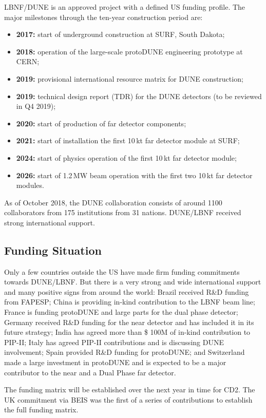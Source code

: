 LBNF/DUNE is an approved project with a defined US funding profile. The major milestones through the ten-year construction period are:
\begin{itemize}
     \item {\bf 2017:} start of underground construction at SURF, South Dakota;
     \item {\bf 2018:} operation of the large-scale protoDUNE engineering prototype at CERN; 
     \item {\bf 2019:} provisional international resource matrix for DUNE construction;
     \item {\bf 2019:} technical design report (TDR) for the DUNE detectors (to be reviewed in Q4 2019);
     \item {\bf 2020:} start of production of far detector components;
     \item {\bf 2021:} start of installation the first 10\,kt far detector module at SURF; 
     \item {\bf 2024:} start of physics operation of the first 10\,kt far detector module;
     \item {\bf 2026:} start of 1.2\,MW beam operation with the first two 10\,kt far detector modules.  
\end{itemize}
As of October 2018, the DUNE collaboration consists of around 1100 collaborators from 175 institutions from 31 nations. DUNE/LBNF received strong international support. 

\subsection{Funding Situation}
Only a few countries outside the US have made firm funding commitments towards DUNE/LBNF. But there is a very strong and wide international support and many positive signs from around the world: 
Brazil received R\&D funding from FAPESP; China is providing in-kind contribution to the LBNF beam line; France is funding protoDUNE and large parts for the dual phase detector; Germany received R\&D funding for the near detector and has included it in its future strategy; India has agreed more than \$ 100M of in-kind contribution to PIP-II; Italy has agreed PIP-II contributions and is discussing DUNE involvement; Spain provided R\&D funding for protoDUNE; and Switzerland made a large investment in protoDUNE and is expected to be a major contributor to the near and a Dual Phase far detector.

The funding matrix will be established over the next year in time for CD2. The UK commitment via BEIS was the first of a series of contributions to establish the full funding matrix.


